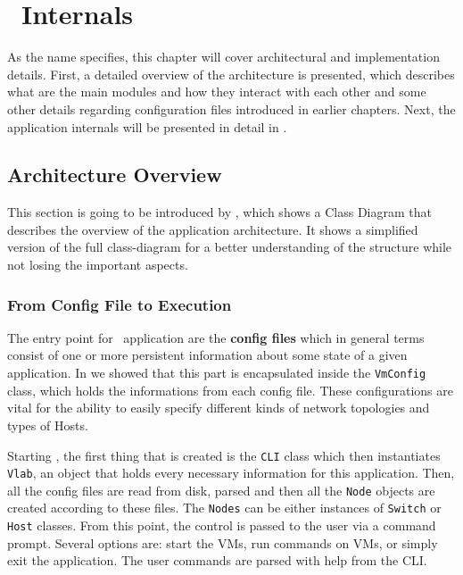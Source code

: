\chapter{\project\ Internals}
\label{chapter:Chapter 4}

As the name specifies, this chapter will cover architectural and implementation details.
First, a detailed overview of the architecture is presented, which describes what are the main modules and how they interact with each other and some other details regarding configuration files introduced in earlier chapters.
Next, the application internals will be presented in detail in .

\section{Architecture Overview}
\label{sec:arh-overview}

This section is going to be introduced by , which shows a Class Diagram that describes the overview of the application architecture.
It shows a simplified version of the full class-diagram for a better understanding of the structure while not losing the important aspects.


\subsection{From Config File to Execution}
\label{sub-sec:arh-config-to-exec}

The entry point for \project\ application are the \textbf{config files} which in general terms consist of one or more persistent information about some state of a given application.
In  we showed that this part is encapsulated inside the \texttt{VmConfig} class, which holds the informations from each config file.
These configurations are vital for the ability to easily specify different kinds of network topologies and types of Hosts.

Starting \project, the first thing that is created is the \texttt{CLI} class which then instantiates \texttt{Vlab}, an object that holds every necessary information for this application.
Then, all the config files are read from disk, parsed and then all the \texttt{Node} objects  are created according to these files. The \texttt{Nodes} can be either instances of \texttt{Switch} or \texttt{Host} classes.
From this point, the control is passed to the user via a command prompt.
Several options are: start the VMs, run commands on VMs, or simply exit the application.
The user commands are parsed with help from the CLI.

